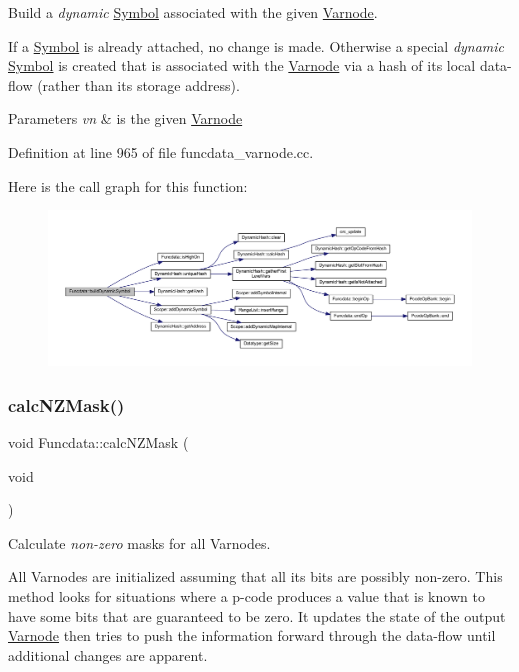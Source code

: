 Build a {\itshape dynamic} \mbox{\hyperlink{class_symbol}{Symbol}} associated with the given \mbox{\hyperlink{class_varnode}{Varnode}}. 

If a \mbox{\hyperlink{class_symbol}{Symbol}} is already attached, no change is made. Otherwise a special {\itshape dynamic} \mbox{\hyperlink{class_symbol}{Symbol}} is created that is associated with the \mbox{\hyperlink{class_varnode}{Varnode}} via a hash of its local data-\/flow (rather than its storage address). 
\begin{DoxyParams}{Parameters}
{\em vn} & is the given \mbox{\hyperlink{class_varnode}{Varnode}} \\
\hline
\end{DoxyParams}


Definition at line 965 of file funcdata\+\_\+varnode.\+cc.

Here is the call graph for this function\+:
\nopagebreak
\begin{figure}[H]
\begin{center}
\leavevmode
\includegraphics[width=350pt]{class_funcdata_aa15db3d569027578de69c065fc607c63_cgraph}
\end{center}
\end{figure}
\mbox{\label{class_funcdata_a5b338d2b2d1a72db73369e8631125ffd}} 
\subsubsection{\texorpdfstring{calcNZMask()}{calcNZMask()}}
{\footnotesize\ttfamily void Funcdata\+::calc\+N\+Z\+Mask (\begin{DoxyParamCaption}\item[{void}]{ }\end{DoxyParamCaption})}



Calculate {\itshape non-\/zero} masks for all Varnodes. 

All Varnodes are initialized assuming that all its bits are possibly non-\/zero. This method looks for situations where a p-\/code produces a value that is known to have some bits that are guaranteed to be zero. It updates the state of the output \mbox{\hyperlink{class_varnode}{Varnode}} then tries to push the information forward through the data-\/flow until additional changes are apparent. 

